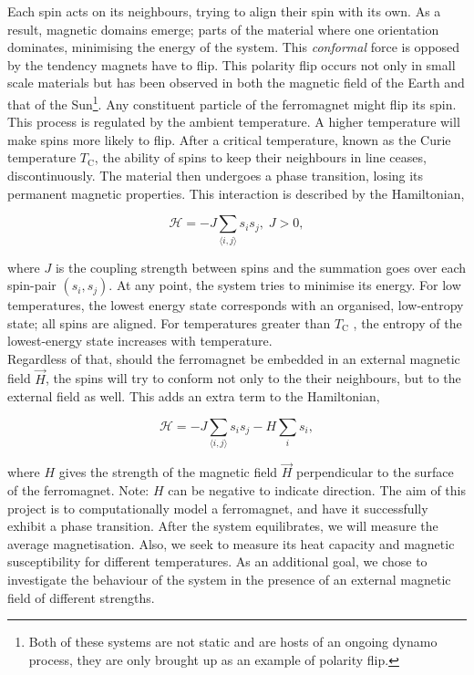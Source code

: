 \documentclass{IAYCPro}
\begin{document}

\raggedbottom
\newpage


Each spin acts on its neighbours, trying to align their spin with its own. As a result, magnetic domains emerge; parts of the material where one orientation dominates, minimising the energy of the system. This \textit{conformal} force is opposed by the tendency magnets have to flip. This polarity flip occurs not only in small scale materials but has been observed in both the magnetic field of the Earth and that of the Sun\footnote{Both of these systems are not static and are hosts of an ongoing dynamo process, they are only brought up as an example of polarity flip.}. Any constituent particle of the ferromagnet might flip its spin. This process is regulated by the ambient temperature. A higher temperature will make spins more likely to flip. After a critical temperature, known as the Curie temperature $T_\mathrm{C}$, the ability of spins to keep their neighbours in line ceases, discontinuously. The material then undergoes a phase transition, losing its permanent magnetic properties. This interaction is described by the Hamiltonian,

\begin{equation}
    \mathcal{H} = -J\sum_{\langle i,j\rangle} s_is_j,\; J>0,
\end{equation}

where $J$ is the coupling strength between spins and the summation goes over each spin-pair $(s_i,s_j)$. At any point, the system tries to minimise its energy. For low temperatures, the lowest energy state corresponds with an organised, low-entropy state; all spins are aligned. For temperatures greater than $T_\mathrm{C}$ , the entropy of the lowest-energy state increases with temperature.\\
Regardless of that, should the ferromagnet be embedded in an external magnetic field $\vec{H}$, the spins will try to conform not only to the their neighbours, but to the external field as well. This adds an extra term to the Hamiltonian,

\begin{equation}
    \mathcal{H} = -J\sum_{\langle i,j\rangle} s_is_j - H \sum_i s_i ,
    \label{eqn: Hamiltonian}
\end{equation}

where $H$ gives the strength of the magnetic field $\vec{H}$ perpendicular to the surface of the ferromagnet. Note: $H$ can be negative to indicate direction. The aim of this project is to computationally model a ferromagnet, and have it successfully exhibit a phase transition. After the system equilibrates, we will measure the average magnetisation. Also, we seek to measure its heat capacity and magnetic susceptibility for different temperatures. As an additional goal, we chose to investigate the behaviour of the system in the presence of an external magnetic field of different strengths.
\end{document}
